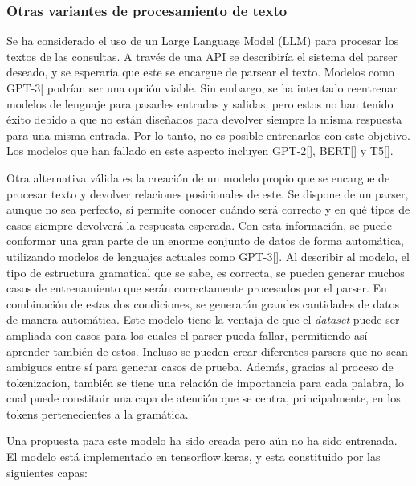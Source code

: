 \subsubsection{Otras variantes de procesamiento de texto }
Se ha considerado el uso de un Large Language Model (LLM) para procesar los textos de las consultas. A través de una API se describiría el sistema del parser deseado, y se esperaría que este se encargue de parsear el texto. Modelos como GPT-3[\cite{gpt3} podrían ser una opción viable. Sin embargo, se ha intentado reentrenar modelos de lenguaje para pasarles entradas y salidas, pero estos no han tenido éxito debido a que no están diseñados para devolver siempre la misma respuesta para una misma entrada. Por lo tanto, no es posible entrenarlos con este objetivo. Los modelos que han fallado en este aspecto incluyen GPT-2[\cite{gpt2}], BERT[\cite{bert}] y T5[\cite{t5}].

Otra alternativa v\'alida es la creación de un modelo propio que se encargue de procesar texto y devolver relaciones posicionales de este. Se dispone de un parser, aunque no sea perfecto, sí permite conocer cuándo será correcto y en qué tipos de casos siempre devolverá la respuesta esperada. Con esta información, se puede conformar una gran parte de un enorme conjunto de datos de forma automática, utilizando modelos de lenguajes actuales como GPT-3[\cite{gpt3}]. Al describir al modelo, el tipo de estructura gramatical que se sabe, es correcta, se pueden generar muchos casos de entrenamiento que ser\'an correctamente procesados por el parser. En combinación de estas dos condiciones, se generarán grandes cantidades de datos de manera automática. Este modelo tiene la ventaja de que el \textit{dataset} puede ser ampliada con casos para los cuales el parser pueda fallar, permitiendo así aprender tambi\'en de estos. Incluso se pueden crear diferentes parsers que no sean ambiguos entre sí para generar casos de prueba. Adem\'as, gracias al proceso de tokenizacion, tambi\'en se tiene una relaci\'on de importancia para cada palabra, lo cual puede constituir una capa de atenci\'on que se centra, principalmente, en los tokens pertenecientes a la gram\'atica.

Una propuesta para este modelo ha sido creada pero aún no ha sido entrenada. El modelo está implementado en tensorflow.keras, y esta constituido por las siguientes capas:

